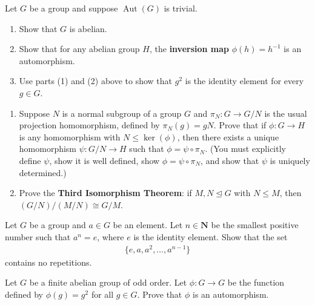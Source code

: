 \documentclass[11pt,twoside,openany]{memoir}
\begin{document}
        \begin{exercise}
        Let $G$ be a group and suppose $\operatorname{Aut}(G)$ is trivial.
        \begin{enumerate}[label = (\arabic*)]
            \item Show that $G$ is abelian.
            \item Show that for any abelian group $H$, the \textbf{inversion map} $\phi(h)=h^{-1}$ is an automorphism.
            \item Use parts (1) and (2) above to show that $g^2$ is the identity element for every $g\in G$.
        \end{enumerate}
        \end{exercise}
        
        \begin{exercise}
            \phantom{a}
        \begin{enumerate}[label = (\arabic*)]
            \item Suppose $N$ is a normal subgroup of a group $G$ and $\pi_N:G\to G/N$ is the usual projection homomorphism, defined by $\pi_N(g)=gN$. Prove that if $\phi:G\to H$ is any homomorphism with $N\leq \ker(\phi)$, then there exists a unique homomorphism $\psi:G/N\to H$ such that $\phi = \psi\circ \pi_N$. (You must explicitly define $\psi$, show it is well defined, show $\phi=\psi\circ\pi_N$, and show that $\psi$ is uniquely determined.)
            \item Prove the 
            \textbf{Third Isomorphism Theorem}: if $M, N\unlhd G$ with $N\le M$, then $(G/N)/(M/N)\cong G/M$.
        \end{enumerate}
        \end{exercise}
        
        \begin{exercise}
        Let $G$ be a group and $a\in G$ be an element. Let $n\in \mathbf{N}$ be the smallest positive number such that $a^n=e$, where $e$ is the identity element. Show that the set
        \begin{equation*}
        \begin{split}
        \{e,a,a^2,\ldots, a^{n-1}\}
        \end{split}
        \end{equation*}
        contains no repetitions.
        \end{exercise}
        
        \begin{exercise}
        Let $G$ be a finite abelian group of odd order. Let $\phi:G\to G$ be the function defined by $\phi(g)=g^2$ for all $g\in G$. Prove that $\phi$ is an automorphism.
        \end{exercise}
        
\end{document}
